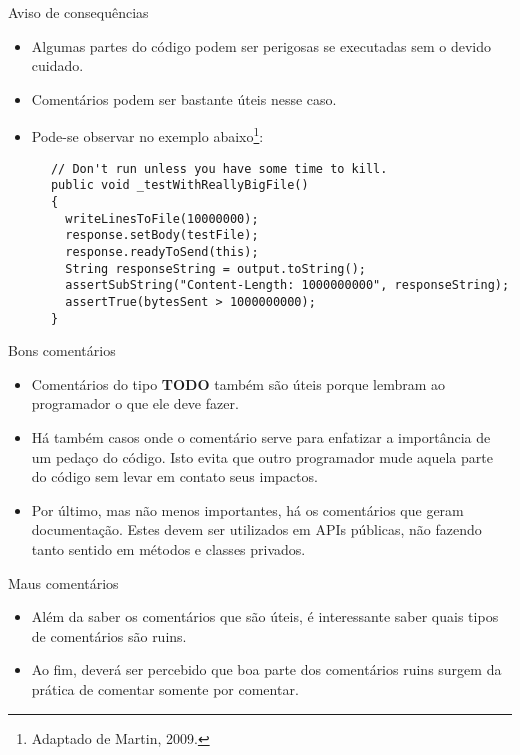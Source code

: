 \documentclass[11pt]{beamer}
\begin{document}
  \begin{frame}[fragile]{Aviso de consequências}
    \begin{itemize}
      \item Algumas partes do código podem ser perigosas se executadas sem o devido cuidado.
      \item Comentários podem ser bastante úteis nesse caso.
      \item Pode-se observar no exemplo abaixo\footnote{Adaptado de Martin, 2009.}:
    \end{itemize}
    \begin{lstlisting}
      // Don't run unless you have some time to kill.
      public void _testWithReallyBigFile()
      {
        writeLinesToFile(10000000);
        response.setBody(testFile);
        response.readyToSend(this);
        String responseString = output.toString();
        assertSubString("Content-Length: 1000000000", responseString);
        assertTrue(bytesSent > 1000000000);
      }
    \end{lstlisting}
  \end{frame}

  \begin{frame}{Bons comentários}
    \begin{itemize}
      \item Comentários do tipo \textbf{TODO} também são úteis porque lembram ao programador o que ele deve fazer.
      \item Há também casos onde o comentário serve para enfatizar a importância de um pedaço do código. Isto evita que outro programador mude aquela parte do código sem levar em contato seus impactos.
      \item Por último, mas não menos importantes, há os comentários que geram documentação. Estes devem ser utilizados em APIs públicas, não fazendo tanto sentido em métodos e classes privados.
    \end{itemize}
  \end{frame}

  \begin{frame}{Maus comentários}
    \begin{itemize}
      \item Além da saber os comentários que são úteis, é interessante saber quais tipos de comentários são ruins.
      \item Ao fim, deverá ser percebido que boa parte dos comentários ruins surgem da prática de comentar somente por comentar.
    \end{itemize}
  \end{frame}
\end{document}
